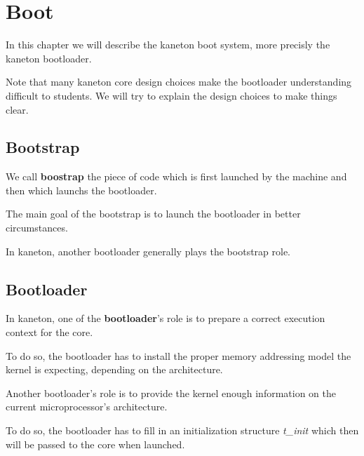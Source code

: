 
%
%

\chapter{Boot}

In this chapter we will describe the kaneton boot system, more precisly
the kaneton bootloader.

Note that many kaneton core design choices make the bootloader understanding
difficult to students. We will try to explain the design choices to make
things clear.

\newpage

%
%

%
%

\section{Bootstrap}

We call \textbf{boostrap} the piece of code which is first launched by the
machine and then which launchs the bootloader.

The main goal of the bootstrap is to launch the bootloader in better
circumstances.

In kaneton, another bootloader generally plays the bootstrap role.

%
%

\section{Bootloader}

In kaneton, one of the \textbf{bootloader}'s role is to prepare a correct
execution context for the core.

To do so, the bootloader has to install the proper memory addressing model
the kernel is expecting, depending on the architecture.

Another bootloader's role is to provide the kernel enough information
on the current microprocessor's architecture.

To do so, the bootloader has to fill in an initialization structure
\textit{t\_init} which then will be passed to the core when launched.

